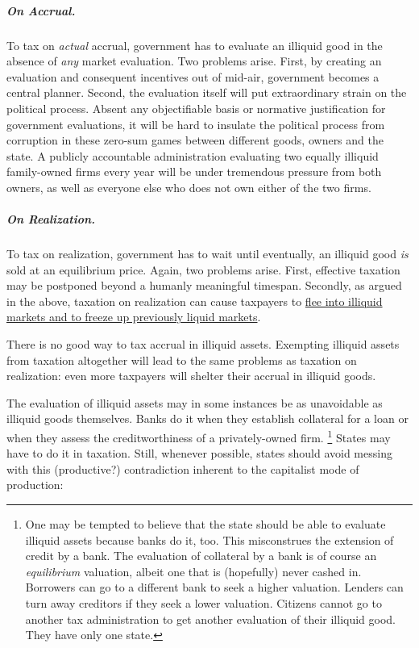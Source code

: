 \subparagraph{On Accrual.}
To tax on \emph{actual} accrual, government has to evaluate an illiquid good in the absence of \emph{any} market evaluation.
Two problems arise.
First, by creating an evaluation and consequent incentives out of mid-air, government becomes a central planner.
Second, the evaluation itself will put extraordinary strain on the political process.
Absent any objectifiable basis or normative justification for government evaluations, it will be hard to insulate the political process from corruption in these zero-sum games between different goods, owners and the state.
A publicly accountable administration evaluating two equally illiquid family-owned firms every year will be under tremendous pressure from both owners, as well as everyone else who does not own either of the two firms.

\subparagraph{On Realization.}
To tax on realization, government has to wait until eventually, an illiquid good \emph{is} sold at an equilibrium price.
Again, two problems arise.
First, effective taxation may be postponed beyond a humanly meaningful timespan.
Secondly, as argued in the above, taxation on realization can cause taxpayers to \href{sec:FreezingUp}{flee into illiquid markets and to freeze up previously liquid markets}.

There is no good way to tax accrual in illiquid assets.
Exempting illiquid assets from taxation altogether will lead to the same problems as taxation on realization:
even more taxpayers will shelter their accrual in illiquid goods.

The evaluation of illiquid assets may in some instances be as unavoidable as illiquid goods themselves.
Banks do it when they establish collateral for a loan or when they assess the creditworthiness of a privately-owned firm.
\footnote{
	One may be tempted to believe that the state should be able to evaluate illiquid assets because banks do it, too.
	This misconstrues the extension of credit by a bank.
	The evaluation of collateral by a bank is of course an \emph{equilibrium} valuation, albeit one that is (hopefully) never cashed in.
	Borrowers can go to a different bank to seek a higher valuation.
	Lenders can turn away creditors if they seek a lower valuation.
	Citizens cannot go to another tax administration to get another evaluation of their illiquid good.
	They have only one state.
}
States may have to do it in taxation.
Still, whenever possible, states should avoid messing with this (productive?) contradiction inherent to the capitalist mode of production:

